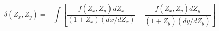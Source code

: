 \begin{equation}\label{corr2}
\delta(Z_x, Z_y)=-\int[\frac{f(Z_x,
Z_y)dZ_x}{(1+Z_x)(dx/dZ_x)}+\frac{f(Z_x,
Z_y)dZ_y}{(1+Z_y)(dy/dZ_y)}]
\end{equation}

